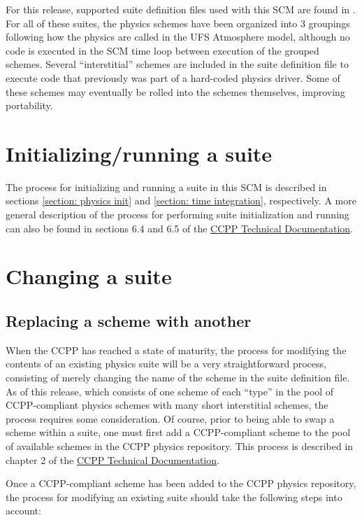 For this release, supported suite definition files used with this SCM are found in . For all of these suites, the physics schemes have been organized into 3 groupings following how the physics are called in the UFS Atmosphere model, although no code is executed in the SCM time loop between execution of the grouped schemes. Several ``interstitial'' schemes are included in the suite definition file to execute code that previously was part of a hard-coded physics driver. Some of these schemes may eventually be rolled into the schemes themselves, improving portability.

\section{Initializing/running a suite}
The process for initializing and running a suite in this SCM is described in sections \ref{section: physics init} and \ref{section: time integration}, respectively. A more general description of the process for performing suite initialization and running can also be found in sections 6.4 and 6.5 of the \href{https://ccpp-techdoc.readthedocs.io/en/v4.1.0/}{CCPP Technical Documentation}.

\section{Changing a suite}

\subsection{Replacing a scheme with another}

When the CCPP has reached a state of maturity, the process for modifying the contents of an existing physics suite will be a very straightforward process, consisting of merely changing the name of the scheme in the suite definition file. As of this release, which consists of one scheme of each ``type'' in the pool of CCPP-compliant physics schemes with many short interstitial schemes, the process requires some consideration. Of course, prior to being able to swap a scheme within a suite, one must first add a CCPP-compliant scheme to the pool of available schemes in the CCPP physics repository. This process is described in chapter 2 of the \href{https://ccpp-techdoc.readthedocs.io/en/v4.1.0/}{CCPP Technical Documentation}.

Once a CCPP-compliant scheme has been added to the CCPP physics repository, the process for modifying an existing suite should take the following steps into account:

